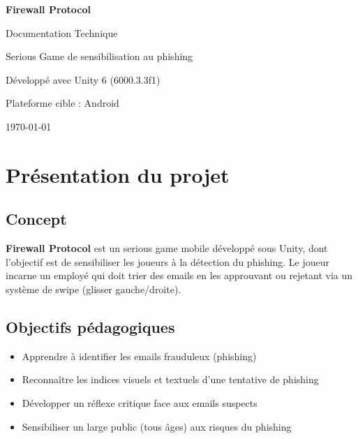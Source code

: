 \documentclass[12pt,a4paper]{article}
\begin{document}
\begin{titlepage}
\centering
\vspace*{3cm}
{\Huge\bfseries Firewall Protocol\par}
\vspace{1cm}
{\Large Documentation Technique\par}
\vspace{2cm}
{\large Serious Game de sensibilisation au phishing\par}
\vspace{1cm}
{\large Développé avec Unity 6 (6000.3.3f1)\par}
\vspace{0.5cm}
{\large Plateforme cible : Android\par}
\vspace{3cm}
{\large\today\par}
\end{titlepage}

\tableofcontents
\newpage

\section{Présentation du projet}

\subsection{Concept}
\textbf{Firewall Protocol} est un serious game mobile développé sous Unity, dont l'objectif est de sensibiliser les joueurs à la détection du phishing. Le joueur incarne un employé qui doit trier des emails en les approuvant ou rejetant via un système de swipe (glisser gauche/droite).

\subsection{Objectifs pédagogiques}
\begin{itemize}
    \item Apprendre à identifier les emails frauduleux (phishing)
    \item Reconnaître les indices visuels et textuels d'une tentative de phishing
    \item Développer un réflexe critique face aux emails suspects
    \item Sensibiliser un large public (tous âges) aux risques du phishing
\end{itemize}
\end{document}
